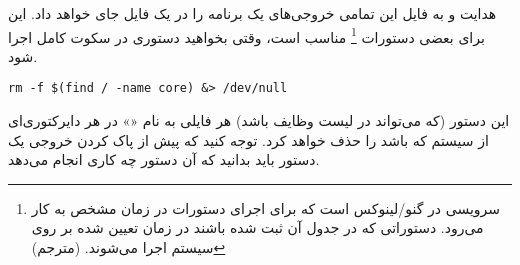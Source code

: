 \begin{example}{هدایت  و  به فایل}
این تمامی خروجی‌های یک برنامه را در یک فایل جای خواهد داد‌. این برای بعضی‌ دستورات
\footnote{
 سرویسی در گنو/لینوکس است که برای اجرای دستورات در زمان مشخص به کار می‌رود.
دستوراتی که در جدول آن ثبت شده باشند در زمان تعیین شده بر روی سیستم اجرا می‌شوند.
(مترجم)
}
مناسب‌ است‌، وقتی بخواهید دستوری در سکوت کامل اجرا شود‌.

\begin{latin}
\begin{lstlisting}
rm -f $(find / -name core) &> /dev/null
\end{lstlisting}
\end{latin}

این دستور (که می‌تواند در لیست وظایف  باشد) هر فایلی به نام «» در هر دایرکتوری‌ای‌
از سیستم که باشد را حذف خواهد کرد. توجه کنید که پیش از پاک کردن خروجی یک دستور باید
بدانید که آن دستور چه کاری انجام می‌دهد.
\end{example}